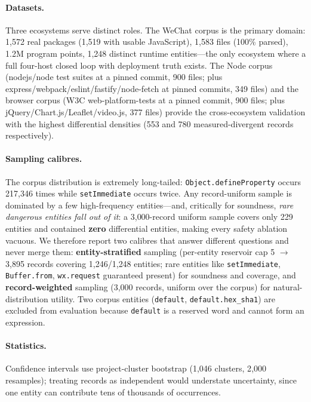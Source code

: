 \documentclass[sigconf,nonacm]{acmart}
\begin{document}
\paragraph{Datasets.} Three ecosystems serve distinct roles. The WeChat corpus is the primary domain: 1{,}572 real packages (1{,}519 with usable JavaScript), 1{,}583 files (100\% parsed), 1.2M program points, 1{,}248 distinct runtime entities---the only ecosystem where a full four-host closed loop with deployment truth exists. The Node corpus (nodejs/node test suites at a pinned commit, 900 files; plus express/webpack/eslint/fastify/node-fetch at pinned commits, 349 files) and the browser corpus (W3C web-platform-tests at a pinned commit, 900 files; plus jQuery/Chart.js/Leaflet/video.js, 377 files) provide the cross-ecosystem validation with the highest differential densities (553 and 780 measured-divergent records respectively).

\paragraph{Sampling calibres.} The corpus distribution is extremely long-tailed: \texttt{Object.defineProperty} occurs 217{,}346 times while \texttt{setImmediate} occurs twice. Any record-uniform sample is dominated by a few high-frequency entities---and, critically for soundness, \emph{rare dangerous entities fall out of it}: a 3{,}000-record uniform sample covers only 229 entities and contained \textbf{zero} differential entities, making every safety ablation vacuous. We therefore report two calibres that answer different questions and never merge them: \textbf{entity-stratified} sampling (per-entity reservoir cap 5 $\to$ 3{,}895 records covering 1{,}246/1{,}248 entities; rare entities like \texttt{setImmediate}, \texttt{Buffer.from}, \texttt{wx.request} guaranteed present) for soundness and coverage, and \textbf{record-weighted} sampling (3{,}000 records, uniform over the corpus) for natural-distribution utility. Two corpus entities (\texttt{default}, \texttt{default.hex\_sha1}) are excluded from evaluation because \texttt{default} is a reserved word and cannot form an expression.

\paragraph{Statistics.} Confidence intervals use project-cluster bootstrap (1{,}046 clusters, 2{,}000 resamples); treating records as independent would understate uncertainty, since one entity can contribute tens of thousands of occurrences.
\end{document}
